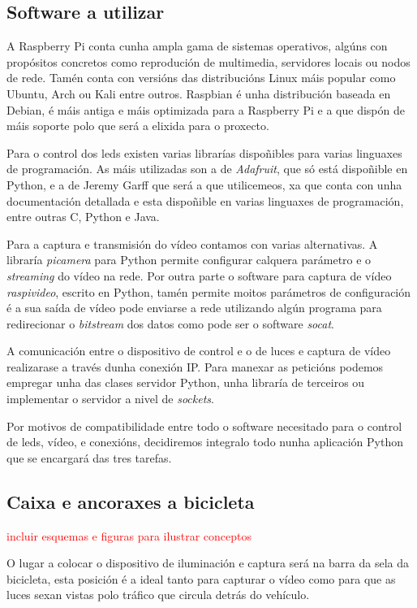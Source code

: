 \subsection{Software a utilizar}
A Raspberry Pi conta cunha ampla gama de sistemas operativos, algúns con propósitos concretos como reprodución de multimedia, servidores locais ou nodos de rede. Tamén conta con versións das distribucións Linux máis popular como Ubuntu, Arch ou Kali entre outros.
Raspbian é unha distribución baseada en Debian, é máis antiga e máis optimizada para a Raspberry Pi e a que dispón de máis soporte polo que será a elixida para o proxecto.

Para o control dos leds existen varias librarías dispoñibles para varias linguaxes de programación. As máis utilizadas son a de \emph{Adafruit}, que só está dispoñible en Python, e a de Jeremy Garff que será a que utilicemeos, xa que conta con unha documentación detallada e esta dispoñible en varias linguaxes de programación, entre outras C, Python e Java.

Para a captura e transmisión do vídeo contamos con varias alternativas. A libraría \emph{picamera} para Python permite configurar calquera parámetro e o \emph{streaming} do vídeo na rede. Por outra parte o software para captura de vídeo \emph{raspivideo}, escrito en Python, tamén permite moitos parámetros de configuración é a sua saída de vídeo pode enviarse a rede utilizando algún programa para redirecionar o \emph{bitstream} dos datos como pode ser o software \emph{socat}.

A comunicación entre o dispositivo de control e o de luces e captura de vídeo realizarase a través dunha conexión IP. Para manexar as peticións podemos empregar unha das clases servidor Python, unha libraría de terceiros ou implementar o servidor a nivel de \emph{sockets}.

Por motivos de compatibilidade entre todo o software necesitado para o control de leds, vídeo, e conexións, decidiremos integralo todo nunha aplicación Python que se encargará das tres tarefas.

\subsection{Caixa e ancoraxes a bicicleta}

\textcolor{red}{incluir esquemas e figuras para ilustrar conceptos}

O lugar a colocar o dispositivo de iluminación e captura será na barra da sela da bicicleta, esta posición é a ideal tanto para capturar o vídeo como para que as luces sexan vistas polo tráfico que circula detrás do vehículo.

